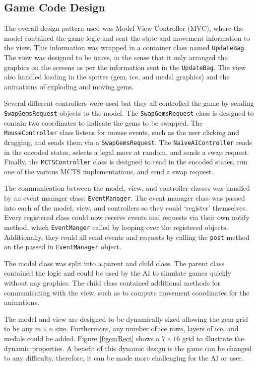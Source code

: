 \documentclass{bhamthesis}
\theoremstyle{definition}
\begin{document}
\subsection{Game Code Design}

The overall design pattern used was Model View Controller (MVC), where the model contained the game logic and sent the state and movement information to the view. This information was wrapped in a container class named \verb|UpdateBag|. The view was designed to be naive, in the sense that it only arranged the graphics on the screens as per the information sent in the \verb|UpdateBag|. The view also handled loading in the sprites (gem, ice, and medal graphics) and the animations of exploding and moving gems.

Several different controllers were used but they all controlled the game by sending \verb|SwapGemsRequest| objects to the model. The \verb|SwapGemsRequest| class is designed to contain two coordinates to indicate the gems to be swapped. The \verb|MouseController| class listens for mouse events, such as the user clicking and dragging, and sends them via a \verb|SwapGemsRequest|. The \verb|NaiveAIController| reads in the encoded states, selects a legal move at random, and sends a swap request.
Finally, the \verb|MCTSController| class is designed to read in the encoded states, run one of the various MCTS implementations, and send a swap request.

The communication between the model, view, and controller classes was handled by an event manager class: \verb|EventManager|. The event manager class was passed into each of the model, view, and controllers so they could `register' themselves. Every registered class could now receive events and requests via their own notify method, which \verb|EventManger| called by looping over the registered objects. Additionally, they could all send events and requests by calling the \verb|post| method on the passed in \verb|EventManager| object.

The model class was split into a parent and child class. The parent class contained the logic and could be used by the AI to simulate games quickly without any graphics. The child class contained additional methods for communicating with the view, such as to compute movement coordinates for the animations.

The model and view are designed to be dynamically sized allowing the gem grid to be any $m \times n$ size. Furthermore, any number of ice rows, layers of ice, and medals could be added. Figure \ref{f:gemRect} shows a $7 \times 16$ grid to illustrate the dynamic properties. A benefit of this dynamic design is the game can be changed to any difficulty, therefore, it can be made more challenging for the AI or user.
\end{document}
